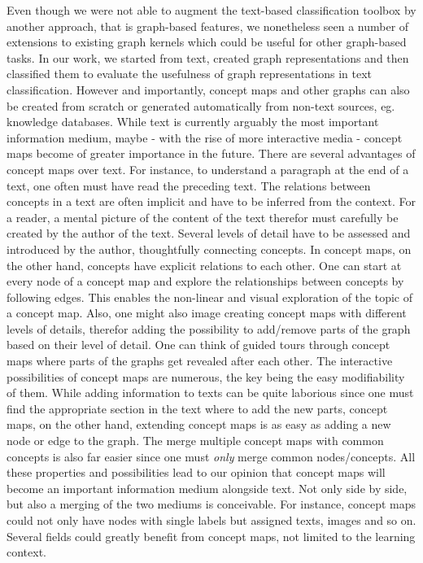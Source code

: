 Even though we were not able to augment the text-based classification toolbox by another approach, that is graph-based features, we nonetheless seen a number of extensions to existing graph kernels which could be useful for other graph-based tasks.
In our work, we started from text, created graph representations and then classified them to evaluate the usefulness of graph representations in text classification.
However and importantly, concept maps and other graphs can also be created from scratch or generated automatically from non-text sources, eg. knowledge databases.
While text is currently arguably the most important information medium, maybe - with the rise of more interactive media - concept maps become of greater importance in the future.
There are several advantages of concept maps over text.
For instance, to understand a paragraph at the end of a text, one often must have read the preceding text.
The relations between concepts in a text are often implicit and have to be inferred from the context.
For a reader, a mental picture of the content of the text therefor must carefully be created by the author of the text.
Several levels of detail have to be assessed and introduced by the author, thoughtfully connecting concepts.
In concept maps, on the other hand, concepts have explicit relations to each other.
One can start at every node of a concept map and explore the relationships between concepts by following edges.
This enables the non-linear and visual exploration of the topic of a concept map.
Also, one might also image creating concept maps with different levels of details, therefor adding the possibility to add/remove parts of the graph based on their level of detail.
One can think of guided tours through concept maps where parts of the graphs get revealed after each other.
The interactive possibilities of concept maps are numerous, the key being the easy modifiability of them.
While adding information to texts can be quite laborious since one must find the appropriate section in the text where to add the new parts, concept maps, on the other hand, extending concept maps is as easy as adding a new node or edge to the graph.
The merge multiple concept maps with common concepts is also far easier since one must \textit{only} merge common nodes/concepts.
All these properties and possibilities lead to our opinion that concept maps will become an important information medium alongside text.
Not only side by side, but also a merging of the two mediums is conceivable.
For instance, concept maps could not only have nodes with single labels but assigned texts, images and so on.
Several fields could greatly benefit from concept maps, not limited to the learning context.

